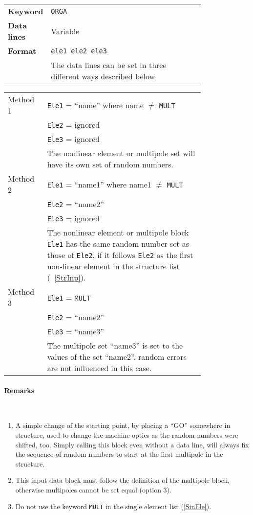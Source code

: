 \bigskip
\begin{tabular}{@{}lp{0.8\linewidth}}
    \textbf{Keyword}    & \texttt{ORGA} \\
    \textbf{Data lines} & Variable \\
    \textbf{Format}     & \texttt{ele1 ele2 ele3} \\
                        & The data lines can be set in three different ways described below
\end{tabular}

\bigskip
\begin{longtabu}{@{}lp{0.8\linewidth}}
    Method 1 & \texttt{Ele1} = ``name'' where name $\ne$ \texttt{MULT} \\
             & \texttt{Ele2} = ignored  \\
             & \texttt{Ele3} = ignored  \\
             & The nonlinear element or multipole set will have its own set of random numbers. \\
    Method 2 & \texttt{Ele1} = ``name1'' where name1 $\ne$ \texttt{MULT} \\
             & \texttt{Ele2} = ``name2'' \\
             & \texttt{Ele3} = ignored \\
             & The nonlinear element or multipole block \texttt{Ele1} has the same random number set as those of \texttt{Ele2}, if it follows \texttt{Ele2} as the first non-linear element in the structure list (~\ref{StrInp}). \\
    Method 3 & \texttt{Ele1} = \texttt{MULT} \\
             & \texttt{Ele2} = ``name2'' \\
             & \texttt{Ele3} = ``name3'' \\
             & The multipole set ``name3'' is set to the values of the set ``name2''. random errors are not influenced in this case.
\end{longtabu}

\paragraph{Remarks}~

\begin{enumerate}
    \item A simple change of the starting point, by placing a ``GO'' somewhere in structure, used to change the machine optics as the random numbers were shifted, too. Simply calling this block even without a data line, will always fix the sequence of random numbers to start at the first multipole in the structure.
    \item This input data block must follow the definition of the multipole block, otherwise multipoles cannot be set equal (option 3).
    \item Do not use the keyword \texttt{MULT} in the single element list (\ref{SinEle}).
\end{enumerate}

